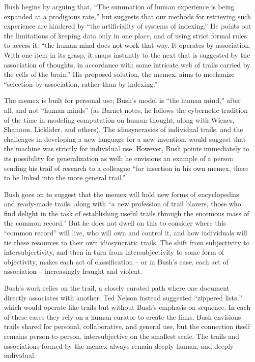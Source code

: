 Bush begins by arguing that, “The summation of human experience is being expanded at a prodigious rate,” but suggests that our methods for retrieving such experience are hindered by “the artificiality of systems of indexing.”  He points out the limitations of keeping data only in one place, and of using strict formal rules to access it: “the human mind does not work that way. It operates by association. With one item in its grasp, it snaps instantly to the next that is suggested by the association of thoughts, in accordance with some intricate web of trails carried by the cells of the brain.” His proposed solution, the memex, aims to mechanize “selection by association, rather than by indexing.” 

The memex is built for personal use; Bush’s model is “the human mind,” after all, and not “human minds” (as Barnet notes, he follows the cybernetic tradition of the time in modeling computation on human thought, along with Wiener, Shannon, Licklider, and others).  The idiosyncrasies of individual trails, and the challenges in developing a new language for a new invention, would suggest that the machine was strictly for individual use. However, Bush points immediately to its possibility for generalization as well; he envisions an example of a person sending his trail of research to a colleague “for insertion in his own memex, there to be linked into the more general trail.” 

Bush goes on to suggest that the memex will hold new forms of encyclopedias and ready-made trails, along with “a new profession of trail blazers, those who find delight in the task of establishing useful trails through the enormous mass of the common record.”  But he does not dwell on this to consider where this “common record” will live, who will own and control it, and how individuals will tie these resources to their own idiosyncratic trails. The shift from subjectivity to intersubjectivity, and then in turn from intersubjectivity to some form of objectivity, makes each act of classification – or in Bush’s case, each act of association – increasingly fraught and violent.

Bush’s work relies on the trail, a closely curated path where one document directly associates with another. Ted Nelson instead suggested “zippered lists,” which would operate like trails but without Bush’s emphasis on sequence.  In each of these cases they rely on a human curator to create the links. Bush envisions trails shared for personal, collaborative, and general use, but the connection itself remains person-to-person, intersubjective on the smallest scale. The trails and associations formed by the memex always remain deeply human, and deeply individual.

